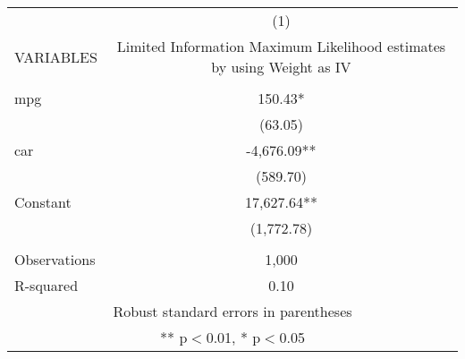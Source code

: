 \begin{tabular}{lc} \hline
 & (1) \\
VARIABLES & Limited Information Maximum Likelihood estimates by using Weight as IV \\ \hline
 &  \\
mpg & 150.43* \\
 & (63.05) \\
car & -4,676.09** \\
 & (589.70) \\
Constant & 17,627.64** \\
 & (1,772.78) \\
 &  \\
Observations & 1,000 \\
 R-squared & 0.10 \\ \hline
\multicolumn{2}{c}{ Robust standard errors in parentheses} \\
\multicolumn{2}{c}{ ** p$<$0.01, * p$<$0.05} \\
\end{tabular}
